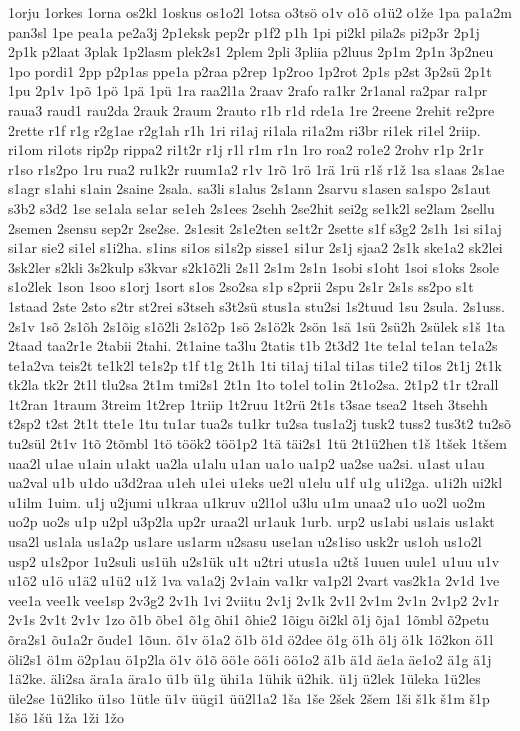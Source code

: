 {1orju
1orkes
1orna
os2kl
1oskus
os1o2l
1otsa
o3tsö
o1v
o1õ
o1ü2
o1že
1pa
pa1a2m
pan3sl
1pe
pea1a
pe2a3j
2p1eksk
pep2r
p1f2
p1h
1pi
pi2kl
pila2s
pi2p3r
2p1j
2p1k
p2laat
3plak
1p2lasm
plek2s1
2plem
2pli
3pliia
p2luus
2p1m
2p1n
3p2neu
1po
pordi1
2pp
p2p1as
ppe1a
p2raa
p2rep
1p2roo
1p2rot
2p1s
p2st
3p2sü
2p1t
1pu
2p1v
1põ
1pö
1pä
1pü
1ra
raa2l1a
2raav
2rafo
ra1kr
2r1anal
ra2par
ra1pr
raua3
raud1
rau2da
2rauk
2raum
2rauto
r1b
r1d
rde1a
1re
2reene
2rehit
re2pre
2rette
r1f
r1g
r2g1ae
r2g1ah
r1h
1ri
ri1aj
ri1ala
ri1a2m
ri3br
ri1ek
ri1el
2riip.
ri1om
ri1ots
rip2p
rippa2
ri1t2r
r1j
r1l
r1m
r1n
1ro
roa2
ro1e2
2rohv
r1p
2r1r
r1so
r1s2po
1ru
rua2
ru1k2r
ruum1a2
r1v
1rõ
1rö
1rä
1rü
r1š
r1ž
1sa
s1aas
2s1ae
s1agr
s1ahi
s1ain
2saine
2sala.
sa3li
s1alus
2s1ann
2sarvu
s1asen
sa1spo
2s1aut
s3b2
s3d2
1se
se1ala
se1ar
se1eh
2s1ees
2sehh
2se2hit
sei2g
se1k2l
se2lam
2sellu
2semen
2sensu
sep2r
2se2se.
2s1esit
2s1e2ten
se1t2r
2sette
s1f
s3g2
2s1h
1si
si1aj
si1ar
sie2
si1el
s1i2ha.
s1ins
si1os
si1s2p
sisse1
si1ur
2s1j
sjaa2
2s1k
ske1a2
sk2lei
3sk2ler
s2kli
3s2kulp
s3kvar
s2k1õ2li
2s1l
2s1m
2s1n
1sobi
s1oht
1soi
s1oks
2sole
s1o2lek
1son
1soo
s1orj
1sort
s1os
2so2sa
s1p
s2prii
2spu
2s1r
2s1s
ss2po
s1t
1staad
2ste
2sto
s2tr
st2rei
s3tseh
s3t2sü
stus1a
stu2si
1s2tuud
1su
2sula.
2s1uss.
2s1v
1sõ
2s1õh
2s1õig
s1õ2li
2s1õ2p
1sö
2s1ö2k
2sön
1sä
1sü
2sü2h
2sülek
s1š
1ta
2taad
taa2r1e
2tabii
2tahi.
2t1aine
ta3lu
2tatis
t1b
2t3d2
1te
te1al
te1an
te1a2s
te1a2va
teis2t
te1k2l
te1s2p
t1f
t1g
2t1h
1ti
ti1aj
ti1al
ti1as
ti1e2
ti1os
2t1j
2t1k
tk2la
tk2r
2t1l
tlu2sa
2t1m
tmi2s1
2t1n
1to
to1el
to1in
2t1o2sa.
2t1p2
t1r
t2rall
1t2ran
1traum
3treim
1t2rep
1triip
1t2ruu
1t2rü
2t1s
t3sae
tsea2
1tseh
3tsehh
t2sp2
t2st
2t1t
tte1e
1tu
tu1ar
tua2s
tu1kr
tu2sa
tus1a2j
tusk2
tuss2
tus3t2
tu2sõ
tu2sül
2t1v
1tõ
2tõmbl
1tö
töök2
töö1p2
1tä
täi2s1
1tü
2t1ü2hen
t1š
1tšek
1tšem
uaa2l
u1ae
u1ain
u1akt
ua2la
u1alu
u1an
ua1o
ua1p2
ua2se
ua2si.
u1ast
u1au
ua2val
u1b
u1do
u3d2raa
u1eh
u1ei
u1eks
ue2l
u1elu
u1f
u1g
u1i2ga.
u1i2h
ui2kl
u1ilm
1uim.
u1j
u2jumi
u1kraa
u1kruv
u2l1ol
u3lu
u1m
unaa2
u1o
uo2l
uo2m
uo2p
uo2s
u1p
u2pl
u3p2la
up2r
uraa2l
ur1auk
1urb.
urp2
us1abi
us1ais
us1akt
usa2l
us1ala
us1a2p
us1are
us1arm
u2sasu
use1an
u2s1iso
usk2r
us1oh
us1o2l
usp2
u1s2por
1u2suli
us1üh
u2s1ük
u1t
u2tri
utus1a
u2tš
1uuen
uule1
u1uu
u1v
u1õ2
u1ö
u1ä2
u1ü2
u1ž
1va
va1a2j
2v1ain
va1kr
va1p2l
2vart
vas2k1a
2v1d
1ve
vee1a
vee1k
vee1sp
2v3g2
2v1h
1vi
2viitu
2v1j
2v1k
2v1l
2v1m
2v1n
2v1p2
2v1r
2v1s
2v1t
2v1v
1zo
õ1b
õbe1
õ1g
õhi1
õhie2
1õigu
õi2kl
õ1j
õja1
1õmbl
õ2petu
õra2s1
õu1a2r
õude1
1õun.
õ1v
ö1a2
ö1b
ö1d
ö2dee
ö1g
ö1h
ö1j
ö1k
1ö2kon
ö1l
öli2s1
ö1m
ö2p1au
ö1p2la
ö1v
ö1õ
öö1e
öö1i
öö1o2
ä1b
ä1d
äe1a
äe1o2
ä1g
ä1j
1ä2ke.
äli2sa
ära1a
ära1o
ü1b
ü1g
ühi1a
1ühik
ü2hik.
ü1j
ü2lek
1üleka
1ü2les
üle2se
1ü2liko
ü1so
1ütle
ü1v
üügi1
üü2l1a2
1ša
1še
2šek
2šem
1ši
š1k
š1m
š1p
1šö
1šü
1ža
1ži
1žo
}
